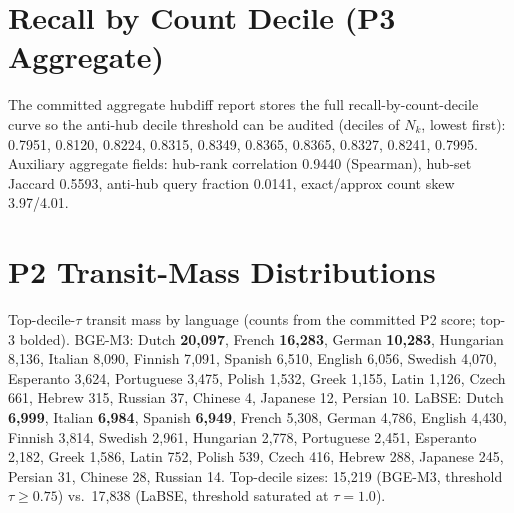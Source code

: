 \documentclass[11pt]{article}
\begin{document}
\section{Recall by Count Decile (P3 Aggregate)}
\label{app:decile}

The committed aggregate hubdiff report stores the full
recall-by-count-decile curve so the anti-hub decile threshold can be
audited (deciles of $N_k$, lowest first): 0.7951, 0.8120, 0.8224, 0.8315,
0.8349, 0.8365, 0.8365, 0.8327, 0.8241, 0.7995. Auxiliary aggregate
fields: hub-rank correlation 0.9440 (Spearman), hub-set Jaccard 0.5593,
anti-hub query fraction 0.0141, exact/approx count skew 3.97/4.01.

\section{P2 Transit-Mass Distributions}
\label{app:transitmass}

Top-decile-$\tau$ transit mass by language (counts from the committed P2
score; top-3 bolded). BGE-M3: Dutch \textbf{20{,}097}, French
\textbf{16{,}283}, German \textbf{10{,}283}, Hungarian 8{,}136, Italian
8{,}090, Finnish 7{,}091, Spanish 6{,}510, English 6{,}056, Swedish
4{,}070, Esperanto 3{,}624, Portuguese 3{,}475, Polish 1{,}532, Greek
1{,}155, Latin 1{,}126, Czech 661, Hebrew 315, Russian 37, Chinese 4,
Japanese 12, Persian 10. LaBSE: Dutch \textbf{6{,}999}, Italian
\textbf{6{,}984}, Spanish \textbf{6{,}949}, French 5{,}308, German
4{,}786, English 4{,}430, Finnish 3{,}814, Swedish 2{,}961, Hungarian
2{,}778, Portuguese 2{,}451, Esperanto 2{,}182, Greek 1{,}586, Latin 752,
Polish 539, Czech 416, Hebrew 288, Japanese 245, Persian 31, Chinese 28,
Russian 14. Top-decile sizes: 15{,}219 (BGE-M3, threshold $\tau \ge
0.75$) vs.\ 17{,}838 (LaBSE, threshold saturated at $\tau = 1.0$).
\end{document}
